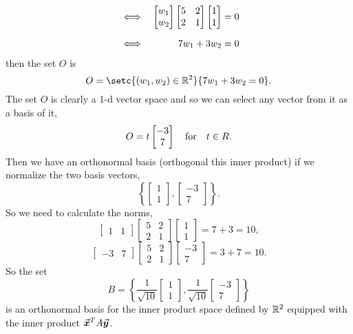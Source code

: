 \documentclass[../MathsNotesBase.tex]{subfiles}
\begin{document}
{\begin{exe}
{\[\begin{aligned}
					&\iff & \begin{bmatrix}w_1 \\ w_2\end{bmatrix} \begin{bmatrix} 5 & 2\\ 2 & 1 \end{bmatrix} \begin{bmatrix}1 \\ 1\end{bmatrix} &= 0 \nn
					&\iff & 7 w_1 + 3 w_2 &= 0
				\end{aligned}\]
				then the set $O$ is
				\[ O = \setc{ (w_1,w_2) \in \R{2} }{ 7 w_1 + 3 w_2 = 0 }. \]
				The set $O$ is clearly a 1-d vector space and so we can select any vector from it as a basis of it,
				\[ O = t \begin{bmatrix}-3 \\ 7\end{bmatrix} \hspace{10pt}\text{for}\hspace{10pt} t \in R{}. \]
				Then we have an orthonormal basis (orthogonal \wrt this inner product) if we normalize the two basis vectors,
				\[ \left\{ \begin{bmatrix}1 \\ 1\end{bmatrix}, \begin{bmatrix}-3 \\ 7\end{bmatrix} \right\}. \]
				So we need to calculate the norms,
				\[ \begin{bmatrix}1 & 1\end{bmatrix} \begin{bmatrix} 5 & 2\\ 2 & 1 \end{bmatrix} \begin{bmatrix}1 \\ 1\end{bmatrix} = 7 + 3 = 10, \]
				\[ \begin{bmatrix}-3 & 7\end{bmatrix} \begin{bmatrix} 5 & 2\\ 2 & 1 \end{bmatrix} \begin{bmatrix}-3 \\ 7\end{bmatrix} = 3 + 7 = 10. \]
				So the set
				\[ B = \left\{ \frac{1}{\sqrt{10}} \begin{bmatrix}1 \\ 1\end{bmatrix}, \frac{1}{\sqrt{10}} \begin{bmatrix}-3 \\ 7\end{bmatrix} \right\} \]
				is an orthonormal basis for the inner product space defined by $\mathbb{R}^{2}$ equipped with the inner product ${ \vec{\bm{x}}^T A \vec{\bm{y}} }$.\\
				
}
\end{exe}}
\end{document}
